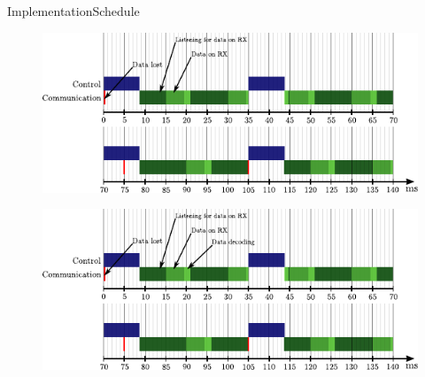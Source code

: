 \begin{frame}{Implementation}{Schedule}
{    }
    {
      \begin{figure}[H]
        \hspace*{-.8cm}
        \includegraphics[width=1.1\linewidth]{figures/timingDiagram4}
      \end{figure}
    }
    {
      \begin{figure}[H]
        \hspace*{-.8cm}
        \includegraphics[width=1.1\linewidth]{figures/timingDiagram5}
      \end{figure}
    }
\end{frame}

